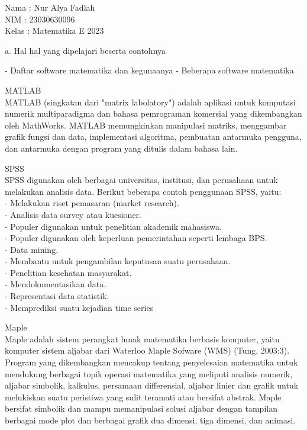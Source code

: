 \documentclass[a4paper,10pt]{article}
\begin{document}
\begin{eulernotebook}
\begin{eulercomment}
Nama  : Nur Alya Fadlah\\
NIM   : 23030630096\\
Kelas : Matematika E 2023

\end{eulercomment}
\eulersubheading{}
\begin{eulercomment}
a. Hal hal yang dipelajari beserta contohnya\\
\end{eulercomment}
\begin{eulerttcomment}
   - Daftar software matematika dan kegunaanya
   - Beberapa software matematika
\end{eulerttcomment}
\begin{eulercomment}
MATLAB\\
MATLAB (singkatan dari "matrix labolatory") adalah aplikasi untuk
komputasi numerik multiparadigma dan bahasa pemrograman komersial yang
dikembangkan oleh MathWorks. MATLAB memungkinkan manipulasi matriks,
menggambar grafik fungsi dan data, implementasi algoritma, pembuatan
antarmuka pengguna, dan antarmuka dengan program yang ditulis dalam
bahasa lain.

SPSS\\
SPSS digunakan oleh berbagai universitas, institusi, dan perusahaan
untuk melakukan analisis data. Berikut beberapa contoh penggunaan
SPSS, yaitu:\\
- Melakukan riset pemasaran (market research).\\
- Analisis data survey atau kuesioner.\\
- Populer digunakan untuk penelitian akademik mahasiswa.\\
- Populer digunakan oleh keperluan pemerintahan seperti lembaga BPS.\\
- Data mining.\\
- Membantu untuk pengambilan keputusan suatu perusahaan.\\
- Penelitian kesehatan masyarakat.\\
- Mendokumentasikan data.\\
- Representasi data statistik.\\
- Memprediksi suatu kejadian time series

Maple\\
Maple adalah sistem perangkat lunak matematika berbasis komputer,
yaitu komputer sistem aljabar dari Waterloo Maple Sofware (WMS) (Tung,
2003:3). Program yang dikembangkan mencakup tentang penyelesaian
matematika untuk mendukung berbagai topik operasi matematika yang
meliputi analisis numerik, aljabar simbolik, kalkulus, persamaan
differensial, aljabar linier dan grafik untuk melukiskan suatu
peristiwa yang sulit teramati atau bersifat abstrak. Maple bersifat
simbolik dan mampu memanipulasi solusi aljabar dengan tampilan
berbagai mode plot dan berbagai grafik dua dimensi, tiga dimensi, dan
animasi.


\end{eulercomment}
\end{eulernotebook}
\end{document}
